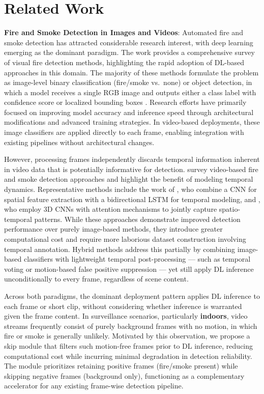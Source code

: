 \documentclass[final,3p,times,twocolumn]{elsarticle}
\begin{document}
\section{Related Work}\label{sec:relatedWork}

\textbf{Fire and Smoke Detection in Images and Videos}: Automated fire
and smoke detection has attracted considerable research interest, with
deep learning emerging as the dominant paradigm. The work
\cite{cheng2024visual} provides a comprehensive survey of visual fire
detection methods, highlighting the rapid adoption of DL-based
approaches in this domain. The majority of these methods formulate the
problem as image-level binary classification (fire/smoke vs.~none) or
object detection, in which a model receives a single RGB image and
outputs either a class label with confidence score or localized bounding
boxes \cite{geng2024yolofm,khan2025optimized}. Research efforts have
primarily focused on improving model accuracy and inference speed
through architectural modifications and advanced training strategies. In
video-based deployments, these image classifiers are applied directly to
each frame, enabling integration with existing pipelines without
architectural changes.

However, processing frames independently discards temporal information
inherent in video data that is potentially informative for detection.
\cite{khan2025beyond} survey video-based fire and smoke detection
approaches and highlight the benefit of modeling temporal dynamics.
Representative methods include the work of \cite{cao2019attention}, who
combine a CNN for spatial feature extraction with a bidirectional LSTM
for temporal modeling, and \cite{ali2025toward}, who employ 3D CNNs
with attention mechanisms to jointly capture spatio-temporal patterns.
While these approaches demonstrate improved detection performance over
purely image-based methods, they introduce greater computational cost
and require more laborious dataset construction involving temporal
annotation. Hybrid methods address this partially by combining
image-based classifiers with lightweight temporal post-processing ---
such as temporal voting \cite{de2023hybrid} or motion-based false
positive suppression \cite{gragnaniello2025flame} --- yet still apply
DL inference unconditionally to every frame, regardless of scene
content.

Across both paradigms, the dominant deployment pattern applies DL
inference to each frame or short clip, without considering whether
inference is warranted given the frame content. In surveillance
scenarios, particularly \textbf{indoors}, video streams frequently
consist of purely background frames with no motion, in which fire or
smoke is generally unlikely. Motivated by this observation, we propose a
skip module that filters such motion-free frames prior to DL inference,
reducing computational cost while incurring minimal degradation in
detection reliability. The module prioritizes retaining positive frames
(fire/smoke present) while skipping negative frames (background only),
functioning as a complementary accelerator for any existing frame-wise
detection pipeline.
\end{document}

